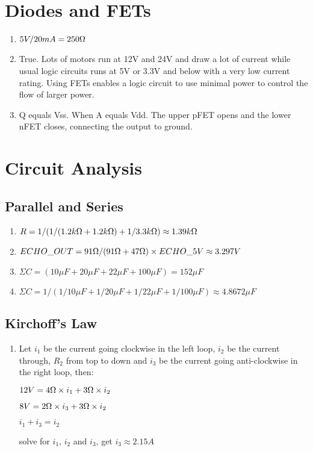 \documentclass{article}
\begin{document}
\section{Diodes and FETs}
\begin{enumerate}
	\item $5V/20mA=250\ohm$
	\item True. Lots of motors run at 12V and 24V and draw a lot of current while usual logic circuits runs at 5V or 3.3V and below with a very low current rating. Using FETs enables a logic circuit to use minimal power to control the flow of larger power.
	\item Q equals Vss. When A equals Vdd. The upper pFET opens and the lower nFET closes, connecting the output to ground.
\end{enumerate}

\section{Circuit Analysis}
\subsection{Parallel and Series}
	\begin{enumerate}
		\item $R=1/(1/(1.2k\ohm+1.2k\ohm)+1/3.3k\ohm)\approx1.39k\ohm$
		\item $ECHO\_OUT=91\ohm/(91\ohm+47\ohm)\times ECHO\_5V\approx 3.297V$
		\item $\Sigma C=(10\mu F+20\mu F+22\mu F+100\mu F)=152\mu F$
		\item $\Sigma C=1/(1/10\mu F+1/20\mu F+1/22\mu F+1/100\mu F)\approx 4.8672\mu F$
	\end{enumerate}
\subsection{Kirchoff's Law}
	\begin{enumerate}
		\item Let $i_1$ be the current going clockwise in the left loop, $i_2$ be the current through, $R_2$ from top to down and $i_3$ be the current going anti-clockwise in the right loop, then: \par
		$12V = 4\ohm \times i_1 + 3\ohm \times i_2$\par
		$8V = 2\ohm \times i_3 + 3\ohm \times i_2 $\par
		$i_1+i_3=i_2$\par
		solve for $i_1$, $i_2$ and $i_3$, get $i_3 \approx 2.15A$
	\end{enumerate}
	
\end{document}

